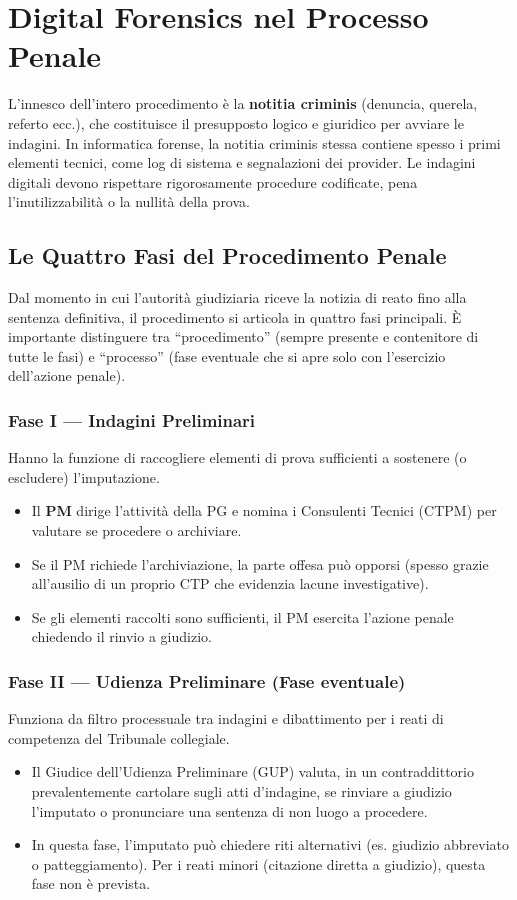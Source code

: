 \documentclass[11pt,a4paper]{article}
\begin{document}
\section{Digital Forensics nel Processo Penale}

L'innesco dell'intero procedimento è la \textbf{notitia criminis} (denuncia, querela, referto ecc.), che costituisce il presupposto logico e giuridico per avviare le indagini. In informatica forense, la notitia criminis stessa contiene spesso i primi elementi tecnici, come log di sistema e segnalazioni dei provider.
Le indagini digitali devono rispettare rigorosamente procedure codificate, pena l'inutilizzabilità o la nullità della prova.

\subsection{Le Quattro Fasi del Procedimento Penale}

Dal momento in cui l'autorità giudiziaria riceve la notizia di reato fino alla sentenza definitiva, il procedimento si articola in quattro fasi principali. È importante distinguere tra ``procedimento'' (sempre presente e contenitore di tutte le fasi) e ``processo'' (fase eventuale che si apre solo con l'esercizio dell'azione penale).

\subsubsection{Fase I --- Indagini Preliminari}
Hanno la funzione di raccogliere elementi di prova sufficienti a sostenere (o escludere) l'imputazione. 
\begin{itemize}
    \item Il \textbf{PM} dirige l'attività della PG e nomina i Consulenti Tecnici (CTPM) per valutare se procedere o archiviare.
    \item Se il PM richiede l'archiviazione, la parte offesa può opporsi (spesso grazie all'ausilio di un proprio CTP che evidenzia lacune investigative).
    \item Se gli elementi raccolti sono sufficienti, il PM esercita l'azione penale chiedendo il rinvio a giudizio.
\end{itemize}

\subsubsection{Fase II --- Udienza Preliminare (Fase eventuale)}
Funziona da filtro processuale tra indagini e dibattimento per i reati di competenza del Tribunale collegiale.
\begin{itemize}
    \item Il Giudice dell'Udienza Preliminare (GUP) valuta, in un contraddittorio prevalentemente cartolare sugli atti d'indagine, se rinviare a giudizio l'imputato o pronunciare una sentenza di non luogo a procedere.
    \item In questa fase, l'imputato può chiedere riti alternativi (es. giudizio abbreviato o patteggiamento). Per i reati minori (citazione diretta a giudizio), questa fase non è prevista.
\end{itemize}
\end{document}
